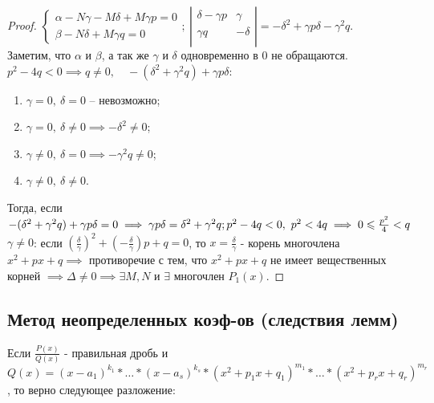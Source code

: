 \documentclass{report}
\theoremstyle{definition}
\begin{document}
\begin{proof}
  $\left\{
    \begin{array}{ll}
      \alpha - N\gamma - M\delta + M\gamma p = 0 \\
      \beta - N\delta + M\gamma q = 0
    \end{array}
    \right. ; \
    \left|
    \begin{array}{cc}
      \delta - \gamma p & \gamma  \\
      \gamma q          & -\delta \\
    \end{array}
    \right| = -\delta^{2} + \gamma p\delta - \gamma^{2}q$. \\

  Заметим, что $\alpha$ и $\beta$, а так же $\gamma$ и $\delta$ одновременно в 0 не обращаются.\\
  $p^{2} - 4q < 0 \implies q \ne 0, \quad -(\delta^{2} + \gamma^{2}q) + \gamma p \delta$:
  \begin{enumerate}
    \item $\gamma = 0,\ \delta = 0$ -- невозможно;
    \item $\gamma = 0,\ \delta \ne 0 \implies -\delta^{2} \ne 0$;
    \item $\gamma \ne 0,\ \delta = 0 \implies -\gamma^{2}q \ne 0$;
    \item $\gamma \ne 0,\ \delta \ne 0$.
  \end{enumerate}

  Тогда, если $-(\delta^{2} + \gamma^{2}q) + \gamma p \delta = 0 \implies \gamma p \delta = \delta^{2}
    + \gamma^{2}q; \\ p^{2} - 4q < 0, \ p^{2} < 4q \implies 0 \leqslant \frac{p^{2}}{4} < q$ \\

  $\gamma \ne 0$: если $(\frac{\delta}{\gamma})^{2} + (-\frac{\delta}{\gamma})p + q = 0$, то
  $x = \frac{\delta}{\gamma}$ - корень многочлена $x^{2} + px + q \implies$ противоречие с тем,
  что $x^{2} + px + q$ не имеет вещественных корней $\implies \Delta \ne 0 \implies \exists M,N$
  и $\exists$ многочлен $P_{1}(x)$.
\end{proof}

\subsection{Метод неопределенных коэф-ов (следствия лемм)}

Если $\frac{P(x)}{Q(x)}$ - правильная дробь и $Q(x) = (x-a_{1})^{k_{1}} * \ldots * (x - a_{s})^{k_{s}} * (x^{2} + p_{1}x +
  q_{1})^{m_{1}} * \ldots * (x^{2} + p_{r}x + q_{r})^{m_{r}}$, то верно следующее разложение:
\end{document}
